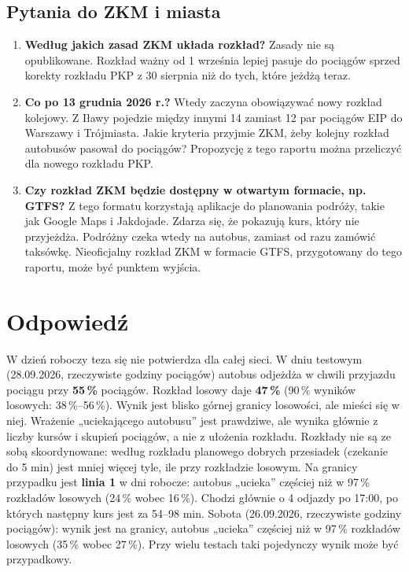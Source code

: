 \documentclass[10pt,a4paper]{article}
\begin{document}
\subsection*{Pytania do ZKM i miasta}
\begin{enumerate}
\item \textbf{Według jakich zasad ZKM układa rozkład?} Zasady nie są opublikowane. Rozkład ważny od 1 września lepiej pasuje do pociągów sprzed korekty rozkładu PKP z 30 sierpnia niż do tych, które jeżdżą teraz.
\item \textbf{Co po 13 grudnia 2026 r.?} Wtedy zaczyna obowiązywać nowy rozkład kolejowy. Z Iławy pojedzie między innymi 14 zamiast 12 par pociągów EIP do Warszawy i Trójmiasta. Jakie kryteria przyjmie ZKM, żeby kolejny rozkład autobusów pasował do pociągów? Propozycję z tego raportu można przeliczyć dla nowego rozkładu PKP.
\item \textbf{Czy rozkład ZKM będzie dostępny w otwartym formacie, np. GTFS?} Z tego formatu korzystają aplikacje do planowania podróży, takie jak Google Maps i Jakdojade. Zdarza się, że pokazują kurs, który nie przyjeżdża. Podróżny czeka wtedy na autobus, zamiast od razu zamówić taksówkę. Nieoficjalny rozkład ZKM w formacie GTFS, przygotowany do tego raportu, może być punktem wyjścia.
\end{enumerate}

\section*{Odpowiedź}
W dzień roboczy teza się nie potwierdza dla całej sieci. W dniu testowym (28.09.2026, rzeczywiste godziny pociągów) autobus odjeżdża w chwili przyjazdu pociągu przy \textbf{55\,\%} pociągów. Rozkład losowy daje \textbf{47\,\%} (90\,\% wyników losowych: 38\,\%--56\,\%). Wynik jest blisko górnej granicy losowości, ale mieści się w niej. Wrażenie „uciekającego autobusu” jest prawdziwe, ale wynika głównie z liczby kursów i skupień pociągów, a nie z ułożenia rozkładu. Rozkłady nie są ze sobą skoordynowane: według rozkładu planowego dobrych przesiadek (czekanie do 5 min) jest mniej więcej tyle, ile przy rozkładzie losowym. Na granicy przypadku jest \textbf{linia 1} w dni robocze: autobus „ucieka” częściej niż w 97\,\% rozkładów losowych (24\,\% wobec 16\,\%). Chodzi głównie o 4 odjazdy po 17:00, po których następny kurs jest za 54--98 min. Sobota (26.09.2026, rzeczywiste godziny pociągów): wynik jest na granicy, autobus „ucieka” częściej niż w 97\,\% rozkładów losowych (35\,\% wobec 27\,\%). Przy wielu testach taki pojedynczy wynik może być przypadkowy.
\end{document}
